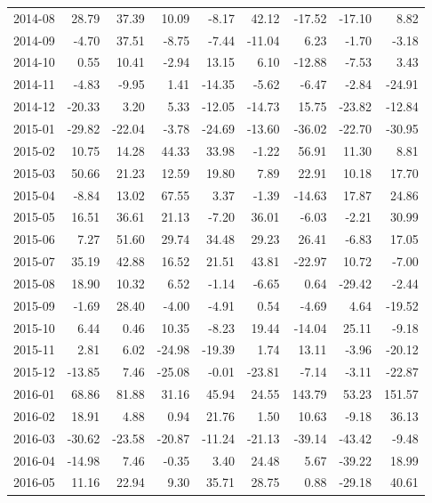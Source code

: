 \begin{table}[ht]
\begin{tabular}{lrrrrrrrr}
  2014-08 & 28.79 & 37.39 & 10.09 & -8.17 & 42.12 & -17.52 & -17.10 & 8.82 \\ 
  2014-09 & -4.70 & 37.51 & -8.75 & -7.44 & -11.04 & 6.23 & -1.70 & -3.18 \\ 
  2014-10 & 0.55 & 10.41 & -2.94 & 13.15 & 6.10 & -12.88 & -7.53 & 3.43 \\ 
  2014-11 & -4.83 & -9.95 & 1.41 & -14.35 & -5.62 & -6.47 & -2.84 & -24.91 \\ 
  2014-12 & -20.33 & 3.20 & 5.33 & -12.05 & -14.73 & 15.75 & -23.82 & -12.84 \\ 
  2015-01 & -29.82 & -22.04 & -3.78 & -24.69 & -13.60 & -36.02 & -22.70 & -30.95 \\ 
  2015-02 & 10.75 & 14.28 & 44.33 & 33.98 & -1.22 & 56.91 & 11.30 & 8.81 \\ 
  2015-03 & 50.66 & 21.23 & 12.59 & 19.80 & 7.89 & 22.91 & 10.18 & 17.70 \\ 
  2015-04 & -8.84 & 13.02 & 67.55 & 3.37 & -1.39 & -14.63 & 17.87 & 24.86 \\ 
  2015-05 & 16.51 & 36.61 & 21.13 & -7.20 & 36.01 & -6.03 & -2.21 & 30.99 \\ 
  2015-06 & 7.27 & 51.60 & 29.74 & 34.48 & 29.23 & 26.41 & -6.83 & 17.05 \\ 
  2015-07 & 35.19 & 42.88 & 16.52 & 21.51 & 43.81 & -22.97 & 10.72 & -7.00 \\ 
  2015-08 & 18.90 & 10.32 & 6.52 & -1.14 & -6.65 & 0.64 & -29.42 & -2.44 \\ 
  2015-09 & -1.69 & 28.40 & -4.00 & -4.91 & 0.54 & -4.69 & 4.64 & -19.52 \\ 
  2015-10 & 6.44 & 0.46 & 10.35 & -8.23 & 19.44 & -14.04 & 25.11 & -9.18 \\ 
  2015-11 & 2.81 & 6.02 & -24.98 & -19.39 & 1.74 & 13.11 & -3.96 & -20.12 \\ 
  2015-12 & -13.85 & 7.46 & -25.08 & -0.01 & -23.81 & -7.14 & -3.11 & -22.87 \\ 
  2016-01 & 68.86 & 81.88 & 31.16 & 45.94 & 24.55 & 143.79 & 53.23 & 151.57 \\ 
  2016-02 & 18.91 & 4.88 & 0.94 & 21.76 & 1.50 & 10.63 & -9.18 & 36.13 \\ 
  2016-03 & -30.62 & -23.58 & -20.87 & -11.24 & -21.13 & -39.14 & -43.42 & -9.48 \\ 
  2016-04 & -14.98 & 7.46 & -0.35 & 3.40 & 24.48 & 5.67 & -39.22 & 18.99 \\ 
  2016-05 & 11.16 & 22.94 & 9.30 & 35.71 & 28.75 & 0.88 & -29.18 & 40.61 \\ 

\end{tabular}
\end{table}
